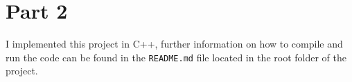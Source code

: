 \section*{Part 2}
I implemented this project in C++, further information on how to compile and run the code can be found in the \texttt{README.md} file located in the root folder of the project.
